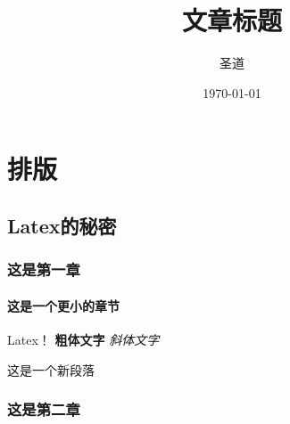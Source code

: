 \documentclass[UTF8]{ctexbook}
\title{文章标题}
\author{圣道}
\date{\today}
\begin{document}
\maketitle
\part{排版}
\chapter{Latex的秘密}
\section{这是第一章}
\subsection{这是一个更小的章节}
Latex！
\textbf{粗体文字}
\textit{斜体文字}

这是一个新段落
\section{这是第二章}
\end{document}
